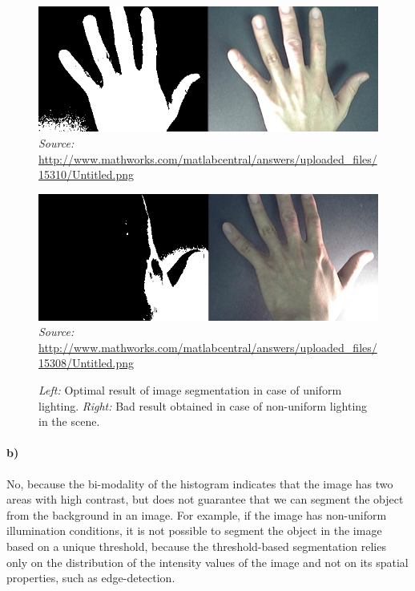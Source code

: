 \documentclass[a4paper,twocolumn]{article}
\begin{document}
	\begin{figure}
	\begin{minipage}{0.49\textwidth}
	\includegraphics[width=\linewidth]{figures/uniform_lighting.png}
	\small \textit{Source:} \url{http://www.mathworks.com/matlabcentral/answers/uploaded_files/15310/Untitled.png}
	\end{minipage}
	\hfill
	\begin{minipage}{0.49\textwidth}
	\includegraphics[width=\linewidth]{figures/non_uniform_lighting.png}
	\small \textit{Source:} \url{http://www.mathworks.com/matlabcentral/answers/uploaded_files/15308/Untitled.png}
	\end{minipage}
	\caption{\textit{Left:} Optimal result of image segmentation in case of uniform lighting. \textit{Right:} Bad result obtained in case of non-uniform lighting in the scene.}
	\label{fig:image_segmentation}
	\end{figure}
	
	\paragraph{b)} %
	No, because the bi-modality of the histogram indicates that the image has two areas with high contrast, but does not guarantee that we can segment the object from the background in an image. For example, if the image has non-uniform illumination conditions, it is not possible to segment the object in the image based on a unique threshold, because the threshold-based segmentation relies only on the distribution of the intensity values of the image and not on its spatial properties, such as edge-detection.
	
\end{document}
